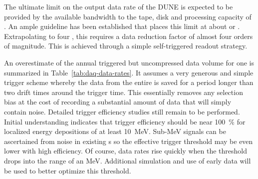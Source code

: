 The ultimate limit on the output data rate of the DUNE   is
expected to be provided by the available bandwidth to the tape,
disk and processing capacity of \fnal. 
An ample guideline has been established that places this limit at
about \offsitepbpy or \offsitegbps.
Extrapolating to four , this requires a  data reduction factor of almost four orders of magnitude. 
This is achieved through a simple self-triggered readout strategy.

An overestimate of the annual triggered but uncompressed data volume
for one \nominalmodsize  {} is summarized in
Table~\ref{tab:daq-data-rates}. 
It assumes a very generous and simple trigger scheme whereby the data
from the entire  is saved for a period longer than
two drift times around the trigger time.
This essentially removes any selection bias at the cost of
recording a substantial amount of data that will simply contain noise.
Detailed trigger efficiency studies still remain to be performed. 
Initial understanding indicates that trigger efficiency should be near
\SI{100}{\%} for localized energy depositions of at least \SI{10}{\MeV}. 
Sub-\si{\MeV} signals can be ascertained from noise in existing \lartpc{}s
so the effective trigger threshold may be even lower with high
efficiency. 
Of course, data rates rise quickly when the threshold drops into the
range of an \si{\MeV}. 
Additional simulation and use of early data will be used to better
optimize this threshold.

